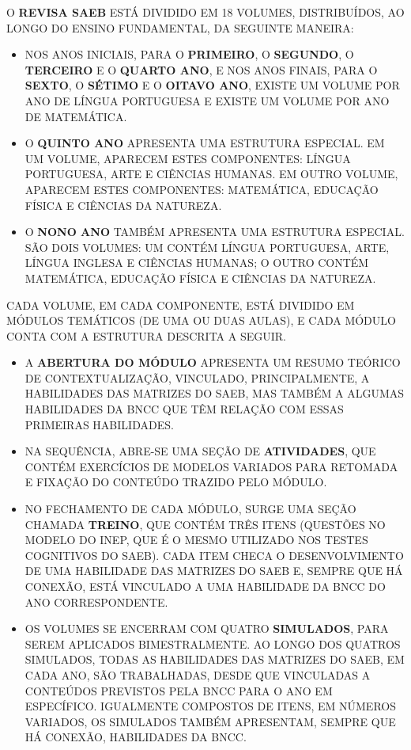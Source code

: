 O \textbf{REVISA SAEB} ESTÁ DIVIDIDO EM 18 VOLUMES, DISTRIBUÍDOS, AO
LONGO DO ENSINO FUNDAMENTAL, DA SEGUINTE MANEIRA:

\begin{itemize}
\item
  NOS ANOS INICIAIS, PARA O \textbf{PRIMEIRO}, O \textbf{SEGUNDO}, O
  \textbf{TERCEIRO} E O \textbf{QUARTO ANO}, E NOS ANOS FINAIS, PARA O
  \textbf{SEXTO}, O \textbf{SÉTIMO} E O \textbf{OITAVO ANO}, EXISTE UM
  VOLUME POR ANO DE LÍNGUA PORTUGUESA E EXISTE UM VOLUME POR ANO DE
  MATEMÁTICA.
\item
  O \textbf{QUINTO ANO} APRESENTA UMA ESTRUTURA ESPECIAL. EM UM VOLUME,
  APARECEM ESTES COMPONENTES: LÍNGUA PORTUGUESA, ARTE E CIÊNCIAS
  HUMANAS. EM OUTRO VOLUME, APARECEM ESTES COMPONENTES: MATEMÁTICA,
  EDUCAÇÃO FÍSICA E CIÊNCIAS DA NATUREZA.
\item
  O \textbf{NONO ANO} TAMBÉM APRESENTA UMA ESTRUTURA ESPECIAL. SÃO DOIS
  VOLUMES: UM CONTÉM LÍNGUA PORTUGUESA, ARTE, LÍNGUA INGLESA E CIÊNCIAS
  HUMANAS; O OUTRO CONTÉM MATEMÁTICA, EDUCAÇÃO FÍSICA E CIÊNCIAS DA
  NATUREZA.
\end{itemize}

CADA VOLUME, EM CADA COMPONENTE, ESTÁ DIVIDIDO EM MÓDULOS TEMÁTICOS (DE
UMA OU DUAS AULAS), E CADA MÓDULO CONTA COM A ESTRUTURA DESCRITA A
SEGUIR.

\begin{itemize}
\item
  A \textbf{ABERTURA DO MÓDULO} APRESENTA UM RESUMO TEÓRICO DE
  CONTEXTUALIZAÇÃO, VINCULADO, PRINCIPALMENTE, A HABILIDADES DAS
  MATRIZES DO SAEB, MAS TAMBÉM A ALGUMAS HABILIDADES DA BNCC QUE TÊM
  RELAÇÃO COM ESSAS PRIMEIRAS HABILIDADES.
\item
  NA SEQUÊNCIA, ABRE-SE UMA SEÇÃO DE \textbf{ATIVIDADES}, QUE CONTÉM
  EXERCÍCIOS DE MODELOS VARIADOS PARA RETOMADA E FIXAÇÃO
  DO CONTEÚDO TRAZIDO PELO MÓDULO.
\item
  NO FECHAMENTO DE CADA MÓDULO, SURGE UMA SEÇÃO CHAMADA \textbf{TREINO},
  QUE CONTÉM TRÊS ITENS (QUESTÕES NO MODELO DO INEP, QUE É O MESMO
  UTILIZADO NOS TESTES COGNITIVOS DO SAEB). CADA ITEM CHECA O
  DESENVOLVIMENTO DE UMA HABILIDADE DAS MATRIZES DO SAEB E, SEMPRE QUE
  HÁ CONEXÃO, ESTÁ VINCULADO A UMA HABILIDADE DA BNCC DO ANO
  CORRESPONDENTE.
\item
  OS VOLUMES SE ENCERRAM COM QUATRO \textbf{SIMULADOS}, PARA SEREM
  APLICADOS BIMESTRALMENTE. AO LONGO DOS QUATROS SIMULADOS, TODAS AS
  HABILIDADES DAS MATRIZES DO SAEB, EM CADA ANO, SÃO TRABALHADAS, DESDE
  QUE VINCULADAS A CONTEÚDOS PREVISTOS PELA BNCC PARA O ANO EM
  ESPECÍFICO. IGUALMENTE COMPOSTOS DE ITENS, EM NÚMEROS VARIADOS, OS
  SIMULADOS TAMBÉM APRESENTAM, SEMPRE QUE HÁ CONEXÃO, HABILIDADES DA
  BNCC.
\end{itemize}
